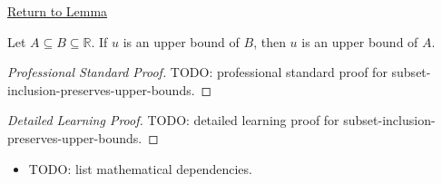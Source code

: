 \newpage
{}
\label{prf:subset-inclusion-preserves-upper-bounds}

\begin{remark*}[Return]
\hyperref[lem:subset-inclusion-preserves-upper-bounds]{Return to Lemma}
\end{remark*}

\begin{lemma*}
Let $A \subseteq B \subseteq \mathbb{R}$. If $u$ is an upper bound of $B$, then $u$ is an upper bound of $A$.
\end{lemma*}

\begin{proof}[Professional Standard Proof]
\LRAProofBodyStart
TODO: professional standard proof for subset-inclusion-preserves-upper-bounds.
\end{proof}

\begin{proof}[Detailed Learning Proof]
\LRAProofBodyStart
TODO: detailed learning proof for subset-inclusion-preserves-upper-bounds.
\end{proof}


\begin{remark*}
\end{remark*}

\begin{dependencies}
\begin{itemize}
  \item TODO: list mathematical dependencies.
\end{itemize}
\end{dependencies}

\clearpage
